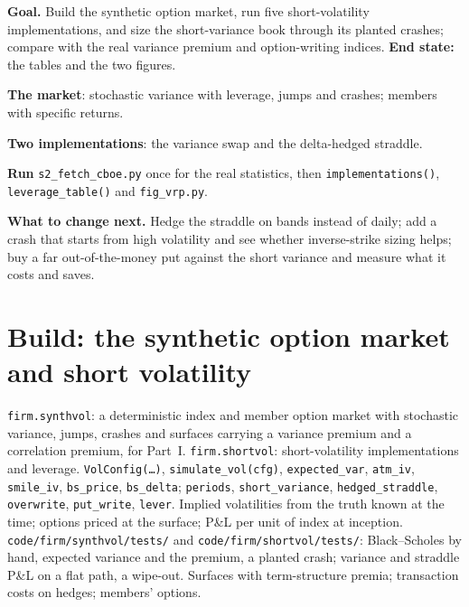 \begin{tutorial}
\textbf{Goal.} Build the synthetic option market, run five short-volatility implementations, and size the short-variance book through its planted
crashes; compare with the real variance premium and option-writing indices. \textbf{End state:} the tables and the two figures.
\begin{tutsteps}
\item \textbf{The market}: stochastic variance with leverage, jumps and crashes; members with specific returns.
\label{lst:s2:harvesting-the-variance-risk-premium:synthvol}
\item \textbf{Two implementations}: the variance swap and the delta-hedged straddle.
\label{lst:s2:harvesting-the-variance-risk-premium:shortvol}
\item \textbf{Run} \texttt{s2\_fetch\_cboe.py} once for the real statistics, then \texttt{implementations()}, \texttt{leverage\_table()} and
\texttt{fig\_vrp.py}.
\end{tutsteps}
\textbf{What to change next.} Hedge the straddle on bands instead of daily; add a crash that starts from high volatility and see whether inverse-strike
sizing helps; buy a far out-of-the-money put against the short variance and measure what it costs and saves.
\end{tutorial}

\section{Build: the synthetic option market and short volatility}\label{bld:s2:harvesting-the-variance-risk-premium:shortvol}

\begin{build}
 \texttt{firm.synthvol}: a deterministic index and member option market with stochastic variance, jumps, crashes and surfaces carrying
a variance premium and a correlation premium, for Part~I. \texttt{firm.shortvol}: short-volatility implementations and leverage.
 \texttt{VolConfig(\dots)}, \texttt{simulate\_vol(cfg)}, \texttt{expected\_var}, \texttt{atm\_iv}, \texttt{smile\_iv}, \texttt{bs\_price},
\texttt{bs\_delta}; \texttt{periods}, \texttt{short\_variance}, \texttt{hedged\_straddle}, \texttt{overwrite}, \texttt{put\_write}, \texttt{lever}.
 Implied volatilities from the truth known at the time; options priced at the surface; P\&L per unit of index at inception.
 \texttt{code/firm/synthvol/tests/} and \texttt{code/firm/shortvol/tests/}: Black--Scholes by hand, expected variance and the
premium, a planted crash; variance and straddle P\&L on a flat path, a wipe-out.
 Surfaces with term-structure premia; transaction costs on hedges; members' options.
\end{build}

